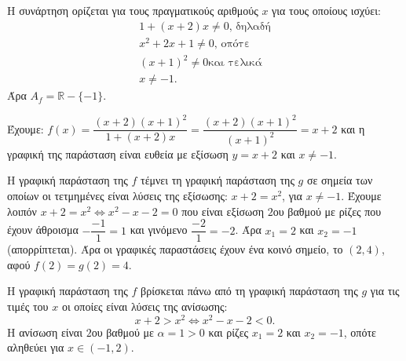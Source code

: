 
\begin{alist}
\item Η συνάρτηση ορίζεται για τους πραγματικούς αριθμούς $x$ για τους οποίους ισχύει:
\begin{gather*}
1 + (x + 2)x \ne 0\text{, δηλαδή} \\
x^2 + 2x + 1 \ne 0\text{, οπότε} \\
(x + 1)^2 \ne 0\text{και τελικά} \\
x \ne -1.
\end{gather*}
Άρα $A_f = \mathbb{R} - \{-1\}$.

\item Έχουμε: $f(x) = \dfrac{(x + 2)(x + 1)^2}{1 + (x + 2)x} = \dfrac{(x + 2)(x + 1)^2}{(x + 1)^2} = x + 2$ και η γραφική της παράσταση
είναι ευθεία με εξίσωση $y = x + 2$ και $x \ne -1$.

\item 
\begin{rlist}
\item Η γραφική παράσταση της $f$ τέμνει τη γραφική παράσταση της $g$ σε σημεία των
οποίων οι τετμημένες είναι λύσεις της εξίσωσης: $x + 2 = x^2$, για $x \ne -1$.
Έχουμε λοιπόν $x + 2 = x^2 \Leftrightarrow x^2 - x - 2 = 0$ που είναι εξίσωση $2$ου βαθμού με ρίζες που
έχουν άθροισμα $-\dfrac{-1}{1} = 1$ και γινόμενο $\dfrac{-2}{1} = -2$. Άρα $x_1 = 2$ και $x_2 = -1$ (απορρίπτεται).
Άρα οι γραφικές παραστάσεις έχουν ένα κοινό σημείο, το $(2, 4)$, αφού $f(2) = g(2) = 4$.

\item H γραφική παράσταση της $f$ βρίσκεται πάνω από τη γραφική παράσταση της $g$ για
τις τιμές του $x$ οι οποίες είναι λύσεις της ανίσωσης:
\[x + 2 > x^2 \Leftrightarrow x^2 - x - 2 < 0.\]
Η ανίσωση είναι $2$ου βαθμού με $\alpha = 1 > 0$ και ρίζες $x_1 = 2$ και $x_2 = -1$, οπότε αληθεύει
για $x \in (-1, 2)$.
\end{rlist}
\end{alist}

